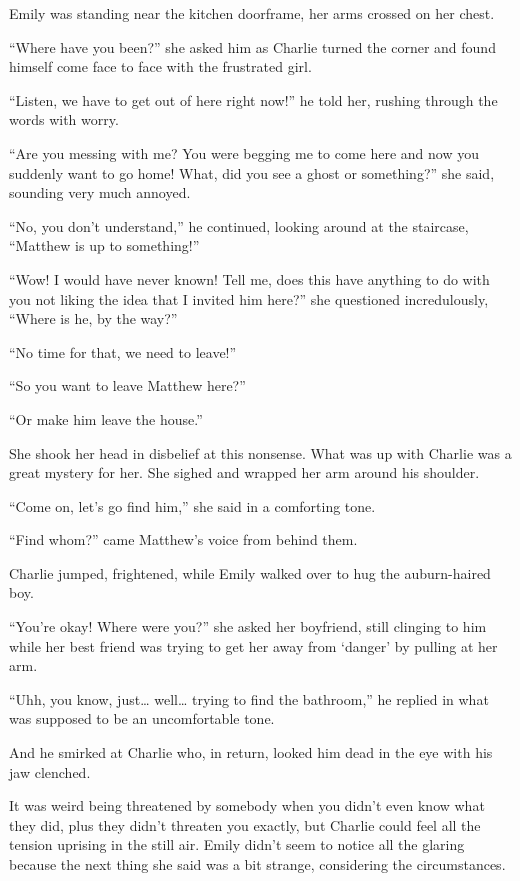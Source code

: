 Emily was standing near the kitchen doorframe, her arms crossed on her chest.

“Where have you been?” she asked him as Charlie turned the corner and found himself come face to face with the frustrated girl.

“Listen, we have to get out of here right now!” he told her, rushing through the words with worry.

“Are you messing with me? You were begging me to come here and now you suddenly want to go home! What, did you see a ghost or something?” she said, sounding very much annoyed.

“No, you don't understand,” he continued, looking around at the staircase, “Matthew is up to something!”

“Wow! I would have never known! Tell me, does this have anything to do with you not liking the idea that I invited him here?” she questioned incredulously, “Where is he, by the way?”

“No time for that, we need to leave!”

“So you want to leave Matthew here?”

“Or make him leave the house.”

She shook her head in disbelief at this nonsense. What was up with Charlie was a great mystery for her. She sighed and wrapped her arm around his shoulder.

“Come on, let's go find him,” she said in a comforting tone.

“Find whom?” came Matthew's voice from behind them.

Charlie jumped, frightened, while Emily walked over to hug the auburn-haired boy.

“You're okay! Where were you?” she asked her boyfriend, still clinging to him while her best friend was trying to get her away from ‘danger' by pulling at her arm.

“Uhh, you know, just… well… trying to find the bathroom,” he replied in what was supposed to be an uncomfortable tone.

And he smirked at Charlie who, in return, looked him dead in the eye with his jaw clenched.

It was weird being threatened by somebody when you didn't even know what they did, plus they didn't threaten you exactly, but Charlie could feel all the tension uprising in the still air. Emily didn't seem to notice all the glaring because the next thing she said was a bit strange, considering the circumstances.

